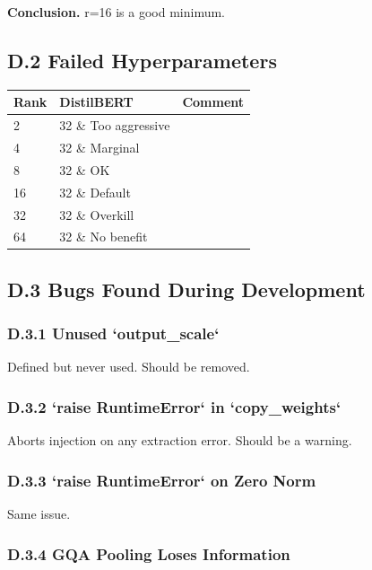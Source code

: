 \textbf{Conclusion.} r=16 is a good minimum.

\subsection{D.2 Failed Hyperparameters}

\begin{table}[H]
\centering
\small
\begin{tabular}{lll}
\toprule
\textbf{Rank} & \textbf{DistilBERT} & \textbf{Comment} \\
\midrule
2 & 32 \& Too aggressive \\
4 & 32 \& Marginal \\
8 & 32 \& OK \\
16 & 32 \& Default \\
32 & 32 \& Overkill \\
64 & 32 \& No benefit \\
\bottomrule
\end{tabular}
\end{table}

\subsection{D.3 Bugs Found During Development}

\subsubsection{D.3.1 Unused `output\_scale`}

Defined but never used. Should be removed.

\subsubsection{D.3.2 `raise RuntimeError` in `copy\_weights`}

Aborts injection on any extraction error. Should be a warning.

\subsubsection{D.3.3 `raise RuntimeError` on Zero Norm}

Same issue.

\subsubsection{D.3.4 GQA Pooling Loses Information}

